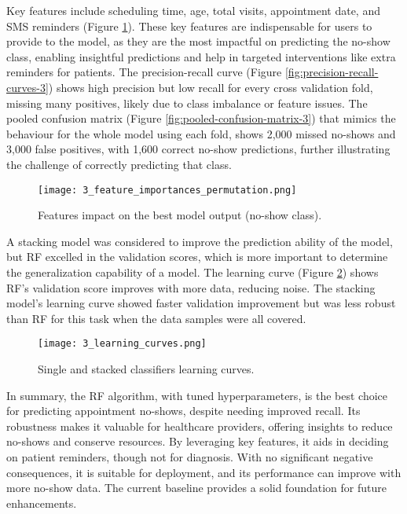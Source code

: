 \documentclass[a4paper,12pt]{article}
\begin{document}
Key features include scheduling time, age, total visits, appointment date, and SMS reminders (Figure \ref{fig:feature-importances-3}). These key features are indispensable for users to provide to the model, as they are the most impactful on predicting the no-show class, enabling insightful predictions and help in targeted interventions like extra reminders for patients. The precision-recall curve (Figure \ref{fig:precision-recall-curves-3}) shows high precision but low recall for every cross validation fold, missing many positives, likely due to class imbalance or feature issues. The pooled confusion matrix (Figure \ref{fig:pooled-confusion-matrix-3}) that mimics the behaviour for the whole model using each fold, shows 2,000 missed no-shows and 3,000 false positives, with 1,600 correct no-show predictions, further illustrating the challenge of correctly predicting that class.



\begin{figure}[h]
  \centering
  \texttt{[image: 3\_feature\_importances\_permutation.png]}
  \caption{Features impact on the best model output (no-show class).}
  \label{fig:feature-importances-3}
\end{figure}

A stacking model was considered to improve the prediction ability of the model, but RF excelled in the validation scores, which is more important to determine the generalization capability of a model. The learning curve (Figure \ref{fig:learning-curves-3}) shows RF's validation score improves with more data, reducing noise. The stacking model's learning curve showed faster validation improvement but was less robust than RF for this task when the data samples were all covered.


\begin{figure}[h]
  \centering
  \texttt{[image: 3\_learning\_curves.png]}
  \caption{Single and stacked classifiers learning curves.}
  \label{fig:learning-curves-3}
\end{figure}

In summary, the RF algorithm, with tuned hyperparameters, is the best choice for predicting appointment no-shows, despite needing improved recall. Its robustness makes it valuable for healthcare providers, offering insights to reduce no-shows and conserve resources. By leveraging key features, it aids in deciding on patient reminders, though not for diagnosis. With no significant negative consequences, it is suitable for deployment, and its performance can improve with more no-show data. The current baseline provides a solid foundation for future enhancements.
\end{document}
